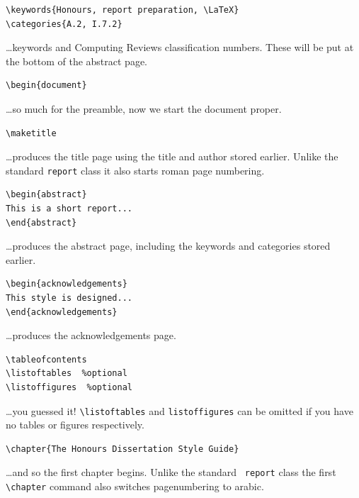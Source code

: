 \documentclass{cshonours}
\begin{document}
\begin{verbatim}
\keywords{Honours, report preparation, \LaTeX}
\categories{A.2, I.7.2}
\end{verbatim}
\ldots keywords and Computing Reviews classification numbers. These
will be put at the bottom of the abstract page.

\begin{verbatim}
\begin{document}
\end{verbatim}
\ldots so much for the preamble, now we start the document proper.

\begin{verbatim}
\maketitle
\end{verbatim}
\ldots produces the title page using the title and author stored
earlier. Unlike the standard {\tt report} class it also starts roman
page numbering.

\begin{verbatim}
\begin{abstract}
This is a short report...
\end{abstract}
\end{verbatim}
\ldots produces the abstract page, including the keywords and
categories stored earlier.

\begin{verbatim}
\begin{acknowledgements}
This style is designed...
\end{acknowledgements}
\end{verbatim}
\ldots produces the acknowledgements page.

\begin{verbatim}
\tableofcontents
\listoftables  %optional
\listoffigures  %optional
\end{verbatim}
\ldots you guessed it! \verb!\listoftables! and \verb!listoffigures!
can be omitted if you have no tables or figures respectively.

\begin{verbatim}
\chapter{The Honours Dissertation Style Guide}
\end{verbatim}

\ldots and so the first chapter begins. Unlike the standard {\tt
report} class the first \verb!\chapter! command also switches
pagenumbering to arabic.
\end{document}
